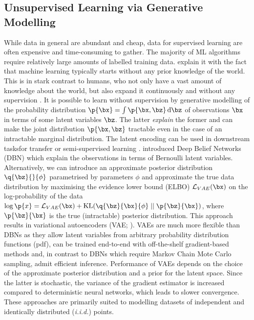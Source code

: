     \subsection{Unsupervised Learning via Generative Modelling}
    \label{sec:unsupervised}
       While data in general are abundant and cheap, data for supervised learning are often expensive and time-consuming to gather. The majority of ML algorithms require relatively large amounts of labelled training data. \cite{Lake2016} explain it with the fact that machine learning typically starts without any prior knowledge of the world. This is in stark contrast to humans, who not only have a vast amount of knowledge about the world, but also expand it continuously and without any supervision \citep{Friston2009guide}. It is possible to learn without supervision by generative modelling of the probability distribution $\p{\bx} = \int \p{\bx, \bz} \dint \bz$ of observations $\bx$ in terms of some latent variables $\bz$. The latter \emph{explain} the former and can make the joint distribution $\p{\bx, \bz}$ tractable even in the case of an intractable marginal distribution. The latent encoding can be used in downstream tasks\eg for transfer or semi-supervised learning \citep{Pan2010}. \cite{Hinton2006dbn} introduced Deep Belief Networks (DBN) which explain the observations in terms of Bernoulli latent variables. Alternatively, we can introduce an approximate posterior distribution $\q{\bz}{}{\phi}$ parametrised by parameters $\phi$ and approximate the true data distribution by maximising the evidence lower bound (ELBO) $\loss[VAE]{\bx}$ on the log-probability of the data $\log \p{x} = \loss[VAE]{\bx} + \kl{ \q{\bz}{\bx}{\phi} }{ \p{\bz}{\bx} }$, where $\p{\bz}{\bx}$ is the true (intractable) posterior distribution. This approach results in variational autoencoders (VAE; \cite{Kingma2014,Rezende2014}). VAEs are much more flexible than DBNs as they allow latent variables from arbitrary probability distribution functions (pdf), can be trained end-to-end with off-the-shelf gradient-based methods and, in contrast to DBNs which require Markov Chain Mote Carlo sampling, admit efficient inference. Performance of VAEs depends on the choice of the approximate posterior distribution and a prior for the latent space. Since the latter is stochastic, the variance of the gradient estimator is increased compared to deterministic neural networks, which leads to slower convergence. These approaches are primarily suited to modelling datasets of independent and identically distributed (\emph{i.i.d.}) points.
       
